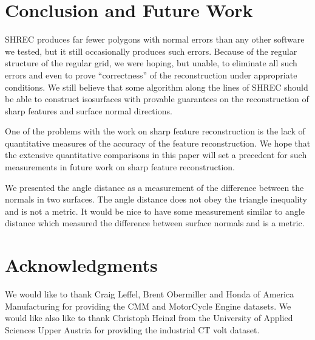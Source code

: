 
\section{Conclusion and Future Work}
\label{section:conclusion}

SHREC produces far fewer polygons with normal errors 
than any other software we tested,
but it still occasionally produces such errors.
Because of the regular structure of the regular grid,
we were hoping, but unable, to eliminate all such errors
and even to prove ``correctness'' of the reconstruction
under appropriate conditions.
We still believe that some algorithm along the lines of SHREC
should be able to construct isosurfaces with provable
guarantees on the reconstruction of sharp features
and surface normal directions.

One of the problems with the work on sharp feature reconstruction
is the lack of quantitative measures of the accuracy 
of the feature reconstruction.
We hope that the extensive quantitative comparisons in this paper
will set a precedent for such measurements in future work
on sharp feature reconstruction.

We presented the angle distance as a measurement of the difference
between the normals in two surfaces.
The angle distance does not obey the triangle inequality
and is not a metric.
It would be nice to have some measurement similar to angle distance
which measured the difference between surface normals
and is a metric.


\section{Acknowledgments}

We would like to thank Craig Leffel, Brent Obermiller 
and Honda of America Manufacturing
for providing the CMM and MotorCycle Engine datasets.
We would like also like to thank Christoph Heinzl
from the University of Applied Sciences Upper Austria
for providing the industrial CT volt dataset.

